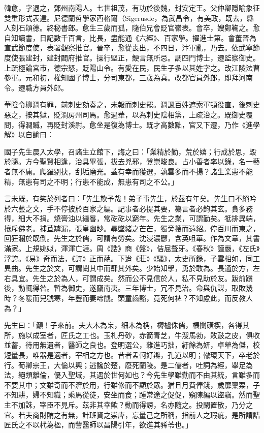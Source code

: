 
\begin{pinyinscope}

 韓愈，字退之，鄧州南陽人。七世祖茂，有功於後魏，封安定王。父仲卿隱喻象征雙重形式表達。尼德蘭哲學家西格爾（Sigerusde，為武昌令，有美政，既去，縣人刻石頌德。終秘書郎。愈生三歲而孤，隨伯兄會貶官嶺表。會卒，嫂鄭鞠之。愈自知讀書，日記數千百言，比長，盡能通《六經》、百家學。擢進士第。會董晉為宣武節度使，表署觀察推官。晉卒，愈從喪出，不四日，汴軍亂，乃去。依武寧節度使張建封，建封闢府推官。操行堅正，鯁言無所忌。調四門博士，遷監察御史。上疏極論宮市，德宗怒，貶陽山令。有愛在民，民生子多以其姓字之。改江陵法曹參軍。元和初，權知國子博士，分司東都，三歲為真。改都官員外郎，即拜河南令。遷職方員外郎。



 華陰令柳澗有罪，前刺史劾奏之，未報而刺史罷。澗諷百姓遮索軍頓役直，後刺史惡之，按其獄，貶澗房州司馬。愈過華，以為刺史陰相黨，上疏治之。既御史覆問，得澗贓，再貶封溪尉。愈坐是復為博士。既才高數黜，官又下遷，乃作《進學解》以自諭曰：



 國子先生晨入太學，召諸生立館下，誨之曰：「業精於勤，荒於嬉；行成於思，毀於隨。方今聖賢相逢，治具畢張，拔去兇邪，登崇畯良。占小善者率以錄，名一藝者無不庸。爬羅剔抉，刮垢磨光。蓋有幸而獲選，孰雲多而不揚？諸生業患不能精，無患有司之不明；行患不能成，無患有司之不公。」



 言未既，有笑於列者曰：「先生欺予哉！弟子事先生，於茲有年矣。先生口不絕吟於六藝之文，手不停披於百家之編。記事者必提其要，纂言者必鉤其玄。貪多務得，細大不捐。燒膏油以繼晷，常矻矻以窮年。先生之業，可謂勤矣。牴排異端，攘斥佛老。補苴罅漏，張皇幽眇。尋墜緒之芒芒，獨旁搜而遠紹。停百川而東之，回狂瀾於既倒。先生之於儒，可謂有勞矣。沈浸濃鬱，含英咀華。作為文章，其書滿家。上規姚姒，渾渾亡涯。周《誥》商《盤》，佶屈聱牙。《春秋》謹嚴，《左氏》浮誇。《易》奇而法，《詩》正而葩。下迨《莊》《騷》，太史所錄，子雲相如，同工異曲。先生之於文，可謂閎其中而肆其外矣。少始知學，勇於敢為。長通於方，左右具宜。先生之於為人，可謂成矣。然而公不見信於人，私不見助於友。跋前躓後，動輒得咎。暫為御史，遂竄南夷。三年博士，冗不見治。命與仇謀，取敗幾時？冬暖而兒號寒，年豐而妻啼饑。頭童齒豁，竟死何裨？不知慮此，而反教人為？」



 先生曰：「籲！子來前。夫大木為杗，細木為桷，欂櫨侏儒，椳闑磺楔，各得其所，施以成室者，匠氏之工也。玉札丹砂，赤箭青芝，牛溲馬勃，敗鼓之皮，俱收並蓄，待用無遺者，醫師之良也。登明選公，雜進巧拙，紆餘為妍，卓犖為傑，校短量長，唯器是適者，宰相之方也。昔者孟軻好辯，孔道以明；轍環天下，卒老於行。荀卿宗王，大倫以興；逃讒於楚，廢死蘭陵。是二儒者，吐詞為經，舉足為法，絕類離倫，優入聖域，其遇於世何如也？今先生學雖勤而不由其統，言雖多而不要其中；文雖奇而不濟於用，行雖修而不顯於眾。猶且月費俸錢，歲靡稟粟，子不知耕，婦不知織；乘馬從徒，安坐而食；踵常途之促促，窺陳編以盜竊。然而聖主不加誅，宰臣不見斥。茲非其幸歟？動而得謗，名亦隨之。投閑置散，乃分之宜。若夫商財賄之有無，計班資之崇庳，忘量己之所稱，指前人之瑕疵，是所謂詰匠氏之不以杙為楹，而訾醫師以昌陽引年，欲進其豨苓也。」




\end{pinyinscope}
